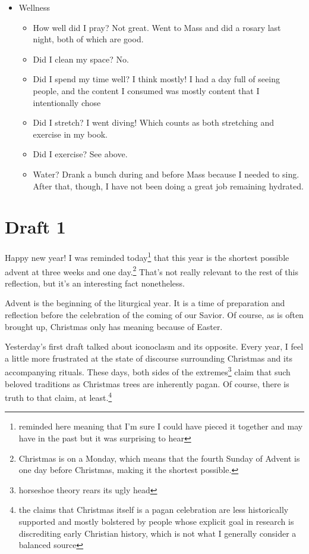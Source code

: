 \documentclass[12pt]{article}[titlepage]
\newcommand{\1}{\={a}}
\newcommand{\2}{\={e}}
\newcommand{\3}{\={\i}}
\newcommand{\4}{\=o}
\newcommand{\5}{\=u}
\newcommand{\6}{\={A}}
\renewcommand{\,}{\textsuperscript{,}}
\begin{document}
\begin{itemize}
\begin{itemize}
\end{itemize}
\item Wellness
\begin{itemize}
\item How well did I pray? Not great. Went to Mass and did a rosary last night, both of which are good.
\item Did I clean my space? No.
\item Did I spend my time well? I think mostly! I had a day full of seeing people, and the content I consumed was mostly content that I intentionally chose
\item Did I stretch? I went diving! Which counts as both stretching and exercise in my book.
\item Did I exercise? See above.
\item Water? Drank a bunch during and before Mass because I needed to sing. After that, though, I have not been doing a great job remaining hydrated.
\end{itemize}
\end{itemize}

\section{Draft 1}
Happy new year!
I was reminded today\footnote{reminded here meaning that I'm sure I could have pieced it together and may have in the past but it was surprising to hear} that this year is the shortest possible advent at three weeks and one day.\footnote{Christmas is on a Monday, which means that the fourth Sunday of Advent is one day before Christmas, making it the shortest possible.}
That's not really relevant to the rest of this reflection, but it's an interesting fact nonetheless.

Advent is the beginning of the liturgical year.
It is a time of preparation and reflection before the celebration of the coming of our Savior.
Of course, as is often brought up, Christmas only has meaning because of Easter.

Yesterday's first draft talked about iconoclasm and its opposite.
Every year, I feel a little more frustrated at the state of discourse surrounding Christmas and its accompanying rituals.
These days, both sides of the extremes\footnote{horseshoe theory rears its ugly head} claim that such beloved traditions as Christmas trees are inherently pagan.
Of course, there is truth to that claim, at least.\footnote{the claims that Christmas itself is a pagan celebration are less historically supported and mostly bolstered by people whose explicit goal in research is discrediting early Christian history, which is not what I generally consider a balanced source}
\end{document}
